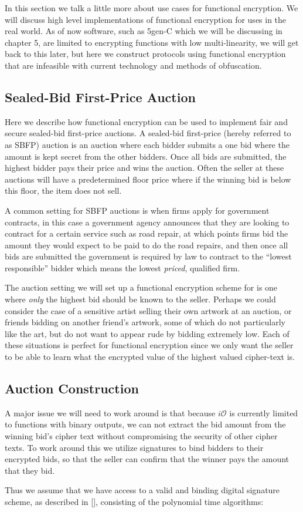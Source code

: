 \documentclass[12pt,twoside]{reedthesis}
\begin{document}
    
    In this section we talk a little more about use cases for functional encryption. We will discuss high level implementations of functional encryption for uses in the real world. As of now software, such as 5gen-C which we will be discussing in chapter 5, are limited to encrypting functions with low multi-linearity, we will get back to this later, but here we construct protocols using functional encryption that are infeasible with current technology and methods of obfuscation.
    \subsection{Sealed-Bid First-Price Auction}
    Here we describe how functional encryption can be used to implement fair and secure sealed-bid first-price auctions. A sealed-bid first-price (hereby referred to as SBFP) auction is an auction where each bidder submits a one bid where the amount is kept secret from the other bidders. Once all bids are submitted, the highest bidder pays their price and wins the auction. Often the seller at these auctions will have a predetermined floor price where if the winning bid is below this floor, the item does not sell. 
    \par A common setting for SBFP auctions is when firms apply for government contracts, in this case a government agency announces that they are looking to contract for a certain service such as road repair, at which points firms bid the amount they would expect to be paid to do the road repairs, and then once all bids are submitted the government is required by law to contract to the ``lowest responsible'' bidder which means the lowest \textit{priced}, qualified firm.
    \par The auction setting we will set up a functional encryption scheme for is one where \textit{only} the highest bid should be known to the seller. Perhaps we could consider the case of a sensitive artist selling their own artwork at an auction, or friends bidding on another friend's artwork, some of which do not particularly like the art, but do not want to appear rude by bidding extremely low. Each of these situations is perfect for functional encryption since we only want the seller to be able to learn what the encrypted value of the highest valued cipher-text is. 
    
    
    \subsection{Auction Construction}
    \newcommand{\sign}[0]{_\text{sign}}
    \par A major issue we will need to work around is that because $i\mathcal{O}$ is currently limited to functions with binary outputs, we can not extract the bid amount from the winning bid's cipher text without compromising the security of other cipher texts. To work around this we utilize signatures to bind bidders to their encrypted bids, so that the seller can confirm that the winner pays the amount that they bid.
    \par Thus we assume that we have access to a valid and binding digital signature scheme, as described in [\cite{Katz:2007:IMC:1206501}], consisting of the polynomial time algorithms: 
    
\end{document}
